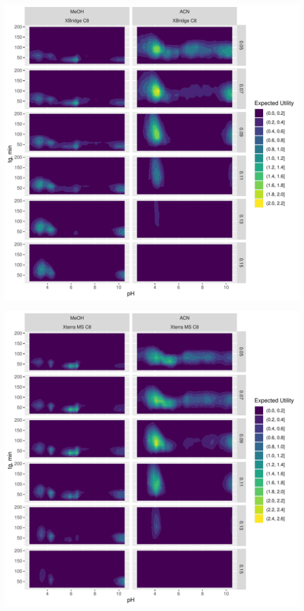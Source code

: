 \documentclass[
]{article}
\begin{document}
\newpage{}

\includegraphics{../figures/casestudy2/utilitymap/utilitymap4.pdf}

\newpage{}

\includegraphics{../figures/casestudy2/utilitymap/utilitymap5.pdf}
\end{document}
